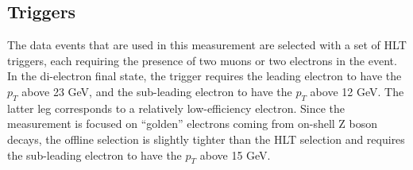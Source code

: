 \begin{table}[htbp]
\caption{List of used data sets collected by the CMS in 2016. Each era contains a unique letter identifier and also specifies the date when the data processing was done. If re-processing was run, it is labeled as ``v2''. Corresponding integrated luminosities are shown in the second column.
}
\label{tab:datasets}
\begin{center}
\end{center}
\end{table}

\subsection{Triggers\label{sec:triggers}}

The data events that are used in this measurement are selected with a set of HLT triggers, each requiring the presence of two muons or two electrons in the event. In the di-electron final state, the trigger requires the leading electron to have the $p_T$ above 23 GeV, and the sub-leading electron to have the $p_T$ above 12 GeV. The latter leg corresponds to a relatively low-efficiency electron. Since the measurement is focused on ``golden'' electrons coming from on-shell Z boson decays, the offline selection is slightly tighter than the HLT selection and requires the sub-leading electron to have the $p_T$ above 15 GeV.

